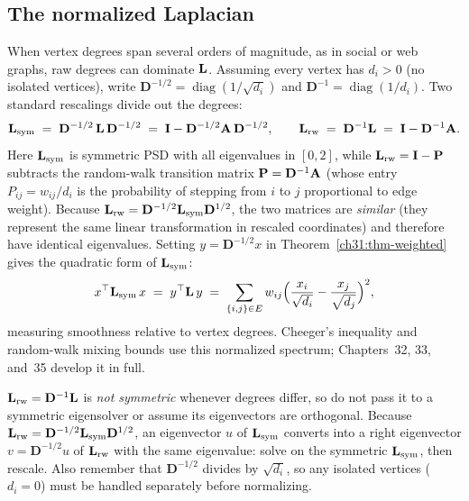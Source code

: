 \subsection{The normalized Laplacian}

When vertex degrees span several orders of magnitude, as in social or web graphs, raw degrees can dominate $\mathbf{L}$. Assuming every vertex has $d_i > 0$ (no isolated vertices), write $\mathbf{D}^{-1/2} = \operatorname{diag}(1/\sqrt{d_i})$ and $\mathbf{D}^{-1} = \operatorname{diag}(1/d_i)$. Two standard rescalings divide out the degrees:
\[
  \mathbf{L}_{\mathrm{sym}} \;=\; \mathbf{D}^{-1/2}\,\mathbf{L}\,\mathbf{D}^{-1/2} \;=\; \mathbf{I} - \mathbf{D}^{-1/2}\mathbf{A}\,\mathbf{D}^{-1/2},
  \qquad
  \mathbf{L}_{\mathrm{rw}} \;=\; \mathbf{D}^{-1}\mathbf{L} \;=\; \mathbf{I} - \mathbf{D}^{-1}\mathbf{A} .
\]
Here $\mathbf{L}_{\mathrm{sym}}$ is symmetric PSD with all eigenvalues in $[0,2]$, while $\mathbf{L}_{\mathrm{rw}} = \mathbf{I}-\mathbf{P}$ subtracts the random-walk transition matrix $\mathbf{P}=\mathbf{D}^{-1}\mathbf{A}$ (whose entry $P_{ij} = w_{ij}/d_i$ is the probability of stepping from $i$ to $j$ proportional to edge weight). Because $\mathbf{L}_{\mathrm{rw}} = \mathbf{D}^{-1/2}\mathbf{L}_{\mathrm{sym}}\mathbf{D}^{1/2}$, the two matrices are \emph{similar} (they represent the same linear transformation in rescaled coordinates) and therefore have identical eigenvalues. Setting $y=\mathbf{D}^{-1/2}x$ in Theorem~\ref{ch31:thm-weighted} gives the quadratic form of $\mathbf{L}_{\mathrm{sym}}$:
\[
  x^\top \mathbf{L}_{\mathrm{sym}}\, x
  \;=\; y^\top \mathbf{L}\, y
  \;=\; \sum_{\{i,j\}\in E} w_{ij}\Bigl(\frac{x_i}{\sqrt{d_i}} - \frac{x_j}{\sqrt{d_j}}\Bigr)^2,
\]
measuring smoothness relative to vertex degrees. Cheeger's inequality and random-walk mixing bounds use this normalized spectrum; Chapters~32, 33, and~35 develop it in full.

\begin{trapbox}
$\mathbf{L}_{\mathrm{rw}} = \mathbf{D}^{-1}\mathbf{L}$ is \emph{not symmetric} whenever degrees differ, so do not pass it to a symmetric eigensolver or assume its eigenvectors are orthogonal. Because $\mathbf{L}_{\mathrm{rw}} = \mathbf{D}^{-1/2}\mathbf{L}_{\mathrm{sym}}\mathbf{D}^{1/2}$, an eigenvector $u$ of $\mathbf{L}_{\mathrm{sym}}$ converts into a right eigenvector $v = \mathbf{D}^{-1/2}u$ of $\mathbf{L}_{\mathrm{rw}}$ with the same eigenvalue: solve on the symmetric $\mathbf{L}_{\mathrm{sym}}$, then rescale. Also remember that $\mathbf{D}^{-1/2}$ divides by $\sqrt{d_i}$, so any isolated vertices ($d_i = 0$) must be handled separately before normalizing.
\end{trapbox}

